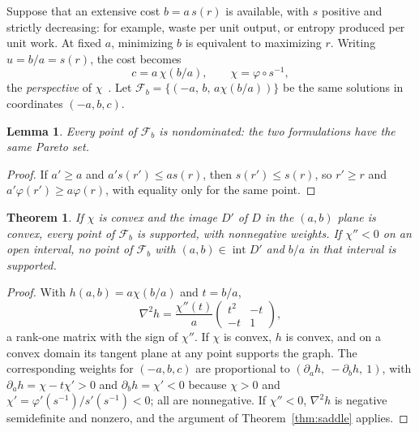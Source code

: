 \documentclass[journal]{IEEEtran}
\newtheorem{theorem}{Theorem}
\newtheorem{lemma}{Lemma}
\theoremstyle{remark}
\begin{document}
Suppose that an extensive cost $b = a\,s(r)$ is available, with $s$ positive and strictly decreasing:
for example, waste per unit output, or entropy produced per unit work. At fixed $a$, minimizing $b$
is equivalent to maximizing $r$. Writing $u = b/a = s(r)$, the cost becomes
\begin{equation}
c = a\,\chi(b/a), \qquad \chi = \varphi\circ s^{-1},
\label{eq:perspective}
\end{equation}
the \emph{perspective} of $\chi$~\cite{Boyd2004}. Let
$\mathcal{F}_b = \{(-a,\,b,\,a\chi(b/a))\}$ be the same solutions in coordinates $(-a, b, c)$.

\begin{lemma}
\label{lem:same}
Every point of $\mathcal{F}_b$ is nondominated: the two formulations have the same Pareto set.
\end{lemma}

\begin{proof}
If $a' \ge a$ and $a's(r') \le a s(r)$, then $s(r') \le s(r)$, so $r' \ge r$ and
$a'\varphi(r') \ge a\varphi(r)$, with equality only for the same point.
\end{proof}

\begin{theorem}
\label{thm:perspective}
If $\chi$ is convex and the image $D'$ of $D$ in the $(a,b)$ plane is convex, every point of
$\mathcal{F}_b$ is supported, with nonnegative weights. If $\chi'' < 0$ on an open interval, no point
of $\mathcal{F}_b$ with $(a,b) \in \operatorname{int} D'$ and $b/a$ in that interval is supported.
\end{theorem}

\begin{proof}
With $h(a,b) = a\chi(b/a)$ and $t = b/a$,
\begin{equation}
\nabla^2 h = \frac{\chi''(t)}{a}\begin{pmatrix} t^2 & -t\\ -t & 1\end{pmatrix},
\end{equation}
a rank-one matrix with the sign of $\chi''$. If $\chi$ is convex, $h$ is convex, and on a convex
domain its tangent plane at any point supports the graph. The corresponding weights for
$(-a,b,c)$ are proportional to $(\partial_a h,\ -\partial_b h,\ 1)$, with
$\partial_a h = \chi - t\chi' > 0$ and $\partial_b h = \chi' < 0$ because $\chi > 0$ and
$\chi' = \varphi'(s^{-1})/s'(s^{-1}) < 0$; all are nonnegative. If $\chi'' < 0$, $\nabla^2 h$ is
negative semidefinite and nonzero, and the argument of Theorem~\ref{thm:saddle} applies.
\end{proof}
\end{document}
